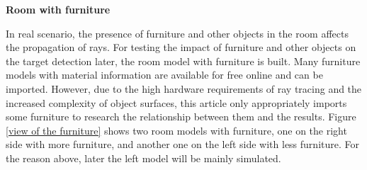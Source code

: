 \documentclass[12pt,DIV14,BCOR12mm,a4paper,footinclude=false,headinclude,parskip=half-,twoside,openright,cleardoublepage=empty,toc=index,bibliography=totoc,listof=totoc]{scrreprt}
\numberwithin{equation}{chapter}
\begin{document}
\begin{spacing}{1.5}
\textbf{\large{Room with furniture}}
\end{spacing}

In real scenario, the presence of furniture and other objects in the room affects the propagation of rays. For testing the impact of furniture and other objects on the target detection later, the room model with furniture is built. Many furniture models with material information are available for free online \cite{blender_furniture} and can be imported. However, due to the high hardware requirements of ray tracing and the increased complexity of object surfaces, this article only appropriately imports some furniture to research the relationship between them and the results. Figure \ref{view of the furniture} shows two room models with furniture, one on the right side with more furniture, and another one on the left side with less furniture. For the reason above, later the left model will be mainly simulated.
\end{document}
